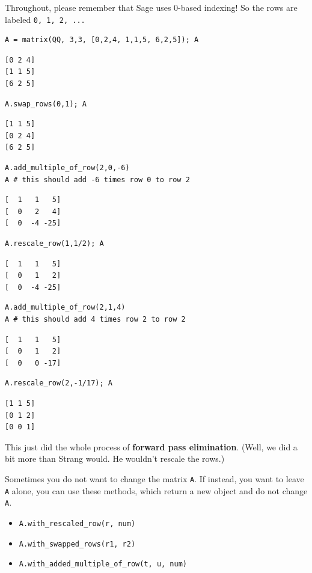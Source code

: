 \documentclass[10pt,]{book}
\newcommand{\terminology}[1]{\textbf{#1}}
\theoremstyle{plain}
\numberwithin{equation}{section}
\begin{document}
        Throughout, please remember that Sage uses \(0\)-based indexing! So
        the rows are labeled \verb?0, 1, 2, ...?
\begin{lstlisting}[style=sageinput]
A = matrix(QQ, 3,3, [0,2,4, 1,1,5, 6,2,5]); A
\end{lstlisting}
\begin{lstlisting}[style=sageoutput]
[0 2 4]
[1 1 5]
[6 2 5]
\end{lstlisting}
\begin{lstlisting}[style=sageinput]
A.swap_rows(0,1); A
\end{lstlisting}
\begin{lstlisting}[style=sageoutput]
[1 1 5]
[0 2 4]
[6 2 5]
\end{lstlisting}
\begin{lstlisting}[style=sageinput]
A.add_multiple_of_row(2,0,-6)
A # this should add -6 times row 0 to row 2
\end{lstlisting}
\begin{lstlisting}[style=sageoutput]
[  1   1   5]
[  0   2   4]
[  0  -4 -25]
\end{lstlisting}
\begin{lstlisting}[style=sageinput]
A.rescale_row(1,1/2); A
\end{lstlisting}
\begin{lstlisting}[style=sageoutput]
[  1   1   5]
[  0   1   2]
[  0  -4 -25]
\end{lstlisting}
\begin{lstlisting}[style=sageinput]
A.add_multiple_of_row(2,1,4)
A # this should add 4 times row 2 to row 2
\end{lstlisting}
\begin{lstlisting}[style=sageoutput]
[  1   1   5]
[  0   1   2]
[  0   0 -17]
\end{lstlisting}
\begin{lstlisting}[style=sageinput]
A.rescale_row(2,-1/17); A
\end{lstlisting}
\begin{lstlisting}[style=sageoutput]
[1 1 5]
[0 1 2]
[0 0 1]
\end{lstlisting}
\par

        This just did the whole process of \terminology{forward pass elimination}.
        (Well, we did a bit more than Strang would. He wouldn't rescale the rows.)
\par

        Sometimes you do not want to change the matrix \verb?A?. If instead, you
        want to leave \verb?A? alone, you can use these methods, which return
        a new object and do not change \verb?A?.
\begin{itemize}
\item{}\verb?A.with_rescaled_row(r, num)?\item{}\verb?A.with_swapped_rows(r1, r2)?\item{}\verb?A.with_added_multiple_of_row(t, u, num)?\end{itemize}
\par
\end{document}
